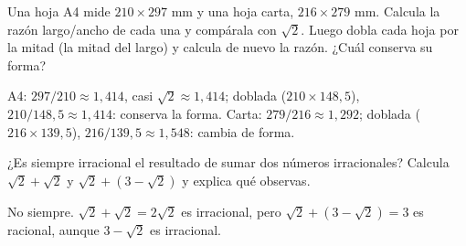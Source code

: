 \documentclass[11pt]{article}
\begin{document}
\begin{preguntas}
\pregunta[1] Una hoja A4 mide $210 \times 297$ mm y una hoja carta, $216 \times 279$ mm.
Calcula la razón largo/ancho de cada una y compárala con $\sqrt{2}$. Luego dobla cada hoja por
la mitad (la mitad del largo) y calcula de nuevo la razón. ¿Cuál conserva su forma?
\espacio{2.4cm}
\begin{solucion}
A4: $297/210 \approx 1{,}414$, casi $\sqrt{2} \approx 1{,}414$; doblada
($210 \times 148{,}5$), $210/148{,}5 \approx 1{,}414$: conserva la forma. Carta:
$279/216 \approx 1{,}292$; doblada ($216 \times 139{,}5$), $216/139{,}5 \approx 1{,}548$:
cambia de forma.
\end{solucion}

\pregunta[1] ¿Es siempre irracional el resultado de sumar dos números irracionales? Calcula
$\sqrt{2} + \sqrt{2}$ y $\sqrt{2} + (3 - \sqrt{2})$ y explica qué observas.
\begin{solucion}
No siempre. $\sqrt{2} + \sqrt{2} = 2\sqrt{2}$ es irracional, pero
$\sqrt{2} + (3 - \sqrt{2}) = 3$ es racional, aunque $3 - \sqrt{2}$ es irracional.
\end{solucion}

\end{preguntas}
\end{document}
